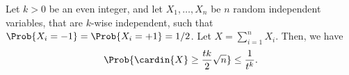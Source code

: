 \begin{lemma}
    Let $k > 0 $ be an even integer, and let $X_1, \ldots, X_n$ be $n$
    random independent variables, that are $k$-wise independent, such
    that $\Prob{X_i=-1} = \Prob{X_i =+1} = 1/2$. Let
    $X = \sum_{i=1}^n X_i$. Then, we have
    \begin{align*}
      \Prob{\smash{\cardin{X} \geq \frac{tk}{2} \sqrt{n}}\Bigr.}%
      \leq%
      \frac{1}{t^k}.
    \end{align*}
\end{lemma}



\nocite{mr-ra-95}

\ChapterEnd{}

   
   


